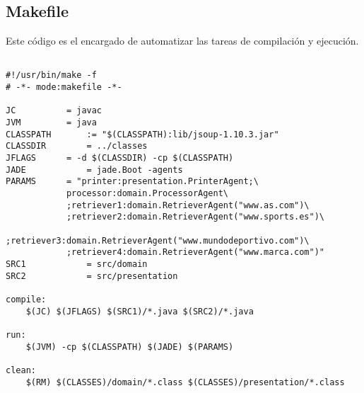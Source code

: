 \documentclass{pre-tfg}
\begin{document}
\subsection{Makefile}

Este código es el encargado de automatizar las tareas de compilación y ejecución.

\begin{lstlisting}[caption=Código que automatiza la tarea de compilación y ejecución,style=makefile]

#!/usr/bin/make -f
# -*- mode:makefile -*-

JC 			= javac
JVM			= java
CLASSPATH		:= "$(CLASSPATH):lib/jsoup-1.10.3.jar"
CLASSDIR 		= ../classes
JFLAGS 		= -d $(CLASSDIR) -cp $(CLASSPATH)
JADE 			= jade.Boot -agents
PARAMS 		= "printer:presentation.PrinterAgent;\
			processor:domain.ProcessorAgent\
			;retriever1:domain.RetrieverAgent("www.as.com")\
			;retriever2:domain.RetrieverAgent("www.sports.es")\
			;retriever3:domain.RetrieverAgent("www.mundodeportivo.com")\
			;retriever4:domain.RetrieverAgent("www.marca.com")" 
SRC1 			= src/domain
SRC2			= src/presentation

compile:
	$(JC) $(JFLAGS) $(SRC1)/*.java $(SRC2)/*.java

run:
	$(JVM) -cp $(CLASSPATH) $(JADE) $(PARAMS)

clean:
	$(RM) $(CLASSES)/domain/*.class $(CLASSES)/presentation/*.class

\end{lstlisting}

\clearpage


\singlespacing

\end{document}
